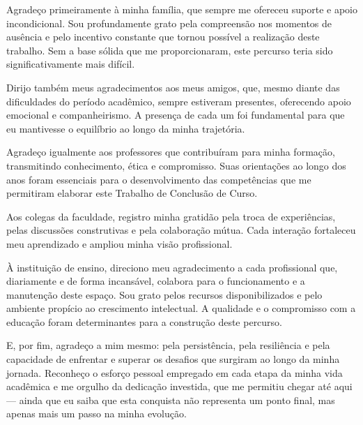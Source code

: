 Agradeço primeiramente à minha família, que sempre me ofereceu suporte e apoio incondicional. Sou profundamente grato pela compreensão nos momentos de ausência e pelo incentivo constante que tornou possível a realização deste trabalho. Sem a base sólida que me proporcionaram, este percurso teria sido significativamente mais difícil.

Dirijo também meus agradecimentos aos meus amigos, que, mesmo diante das dificuldades do período acadêmico, sempre estiveram presentes, oferecendo apoio emocional e companheirismo. A presença de cada um foi fundamental para que eu mantivesse o equilíbrio ao longo da minha trajetória.

Agradeço igualmente aos professores que contribuíram para minha formação, transmitindo conhecimento, ética e compromisso. Suas orientações ao longo dos anos foram essenciais para o desenvolvimento das competências que me permitiram elaborar este Trabalho de Conclusão de Curso.

Aos colegas da faculdade, registro minha gratidão pela troca de experiências, pelas discussões construtivas e pela colaboração mútua. Cada interação fortaleceu meu aprendizado e ampliou minha visão profissional.

À instituição de ensino, direciono meu agradecimento a cada profissional que, diariamente e de forma incansável, colabora para o funcionamento e a manutenção deste espaço. Sou grato pelos recursos disponibilizados e pelo ambiente propício ao crescimento intelectual. A qualidade e o compromisso com a educação foram determinantes para a construção deste percurso.

E, por fim, agradeço a mim mesmo: pela persistência, pela resiliência e pela capacidade de enfrentar e superar os desafios que surgiram ao longo da minha jornada. Reconheço o esforço pessoal empregado em cada etapa da minha vida acadêmica e me orgulho da dedicação investida, que me permitiu chegar até aqui — ainda que eu saiba que esta conquista não representa um ponto final, mas apenas mais um passo na minha evolução.